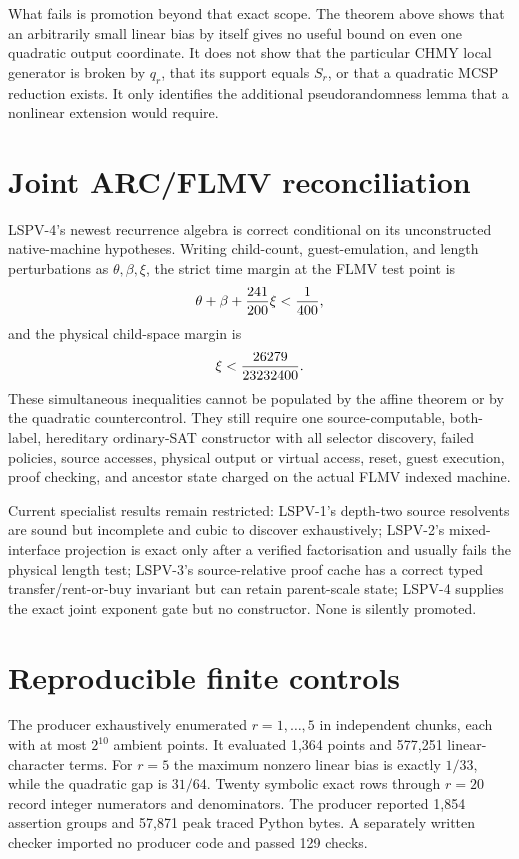 \documentclass[11pt]{article}
\begin{document}
What fails is promotion beyond that exact scope.  The theorem above shows that
an arbitrarily small linear bias by itself gives no useful bound on even one
quadratic output coordinate.  It does not show that the particular CHMY local
generator is broken by $q_r$, that its support equals $S_r$, or that a quadratic
MCSP reduction exists.  It only identifies the additional pseudorandomness
lemma that a nonlinear extension would require.

\section{Joint ARC/FLMV reconciliation}
LSPV-4's newest recurrence algebra is correct conditional on its unconstructed
native-machine hypotheses.  Writing child-count, guest-emulation, and length
perturbations as $\theta,\beta,\xi$, the strict time margin at the FLMV test point
is
\[
 \theta+\beta+{241\over200}\xi<{1\over400},
\]
and the physical child-space margin is
\[
 \xi<{26279\over23232400}.
\]
These simultaneous inequalities cannot be populated by the affine theorem or
by the quadratic countercontrol.  They still require one source-computable,
both-label, hereditary ordinary-SAT constructor with all selector discovery,
failed policies, source accesses, physical output or virtual access, reset,
guest execution, proof checking, and ancestor state charged on the actual FLMV
indexed machine.

Current specialist results remain restricted: LSPV-1's depth-two source
resolvents are sound but incomplete and cubic to discover exhaustively;
LSPV-2's mixed-interface projection is exact only after a verified factorisation
and usually fails the physical length test; LSPV-3's source-relative proof cache
has a correct typed transfer/rent-or-buy invariant but can retain parent-scale
state; LSPV-4 supplies the exact joint exponent gate but no constructor.  None
is silently promoted.

\section{Reproducible finite controls}
The producer exhaustively enumerated $r=1,\ldots,5$ in independent chunks, each
with at most $2^{10}$ ambient points.  It evaluated 1,364 points and 577,251
linear-character terms.  For $r=5$ the maximum nonzero linear bias is exactly
$1/33$, while the quadratic gap is $31/64$.  Twenty symbolic exact rows through
$r=20$ record integer numerators and denominators.  The producer reported 1,854
assertion groups and 57,871 peak traced Python bytes.  A separately written
checker imported no producer code and passed 129 checks.
\end{document}
